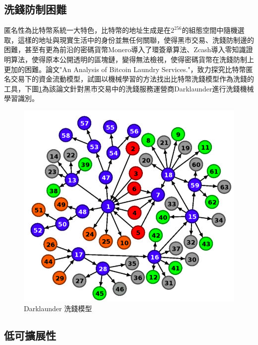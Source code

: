 		\subsection{洗錢防制困難}
		匿名性為比特幣系統一大特色，比特幣的地址生成是在$2^256$的組態空間中隨機選取，這樣的地址與現實生活中的身份並無任何關聯，使得黑市交易、洗錢防制邊的困難，甚至有更為前沿的密碼貨幣Monero導入了環簽章算法、Zcash導入零知識證明算法\parencite{Zero-KnowledgeProofsofIdentity}，使得原本公開透明的區塊鏈，變得無法檢視，使得密碼貨幣在洗錢防制上更加的困難。論文"An Analysis of Bitcoin Laundry Services."\parencite{AnAnalysisofBitcoinLaundryServices}，致力探究比特幣匿名交易下的資金流動模型，試圖以機械學習的方法找出比特幣洗錢模型作為洗錢的工具，下圖\ref{Darklaunderworkflow}為該論文針對黑市交易中的洗錢服務運營商Darklaunder進行洗錢機械學習識別。
			\begin{figure}[h]
				\centering
				\includegraphics[width = .7\textwidth]{Darklaunderworkflow.png}
				\caption{Darklaunder 洗錢模型\parencite{AnAnalysisofBitcoinLaundryServices}}\label{Darklaunderworkflow}
			\end{figure}
		

		\subsection{低可擴展性}


